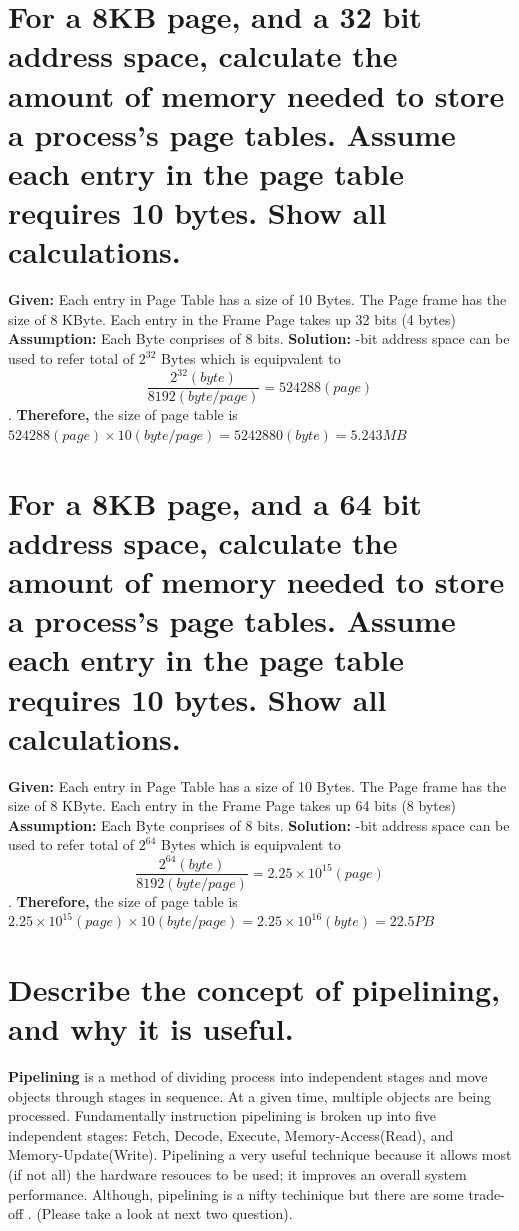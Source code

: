 \documentclass[letterpaper,10pt,titlepage,fleqn]{article}
\begin{document}
\section*{For a 8KB page, and a 32 bit address space, calculate the amount of memory needed to store a process's page tables. Assume each entry in the page table requires 10 bytes. Show all calculations.}
\textbf{Given: }
Each entry in Page Table has a size of 10 Bytes. 
The Page frame has the size of 8 KByte. \newline
Each entry in the Frame Page takes up 32 bits (4 bytes)\newline
\textbf{Assumption: } Each Byte conprises of 8 bits. \newline
\textbf{Solution: }-bit address space can be used to refer total of $ 2^{32} $ Bytes\newline
which is equipvalent to \[ \dfrac{2^{32}(byte)}{8192 (byte/page)} = 524288 (page) \] .\newline
\textbf{Therefore, }the size of page table is $ 524288 (page) \times 10 (byte/page) = 5242880(byte) = 5.243 MB$

\section*{For a 8KB page, and a 64 bit address space, calculate the amount of memory needed to store a process's page tables. Assume each entry in the page table requires 10 bytes. Show all calculations.}
\textbf{Given: }
Each entry in Page Table has a size of 10 Bytes. 
The Page frame has the size of 8 KByte. \newline
Each entry in the Frame Page takes up 64 bits (8 bytes)\newline
\textbf{Assumption: } Each Byte conprises of 8 bits. \newline
\textbf{Solution: }-bit address space can be used to refer total of $ 2^{64} $ Bytes\newline
which is equipvalent to \[ \dfrac{2^{64}(byte)}{8192 (byte/page)} = 2.25 \times 10^{15} (page) \] .\newline
\textbf{Therefore, }the size of page table is $ 2.25 \times 10^{15} (page) \times 10 (byte/page) = 2.25 \times
10^{16} (byte) = 22.5 PB$


\section*{Describe the concept of pipelining, and why it is useful.}
\textbf{Pipelining} is a method of dividing process into independent stages and move objects through stages in
sequence. At a given time, multiple objects are being processed. Fundamentally instruction pipelining is broken
up into five independent stages: Fetch, Decode, Execute, Memory-Access(Read), and Memory-Update(Write). 
Pipelining a very useful technique because it allows most (if not all) the hardware resouces to be used; it 
improves an overall system performance. Although, pipelining is a nifty techinique but there are some trade-off
. (Please take a look at next two question).
\end{document}
